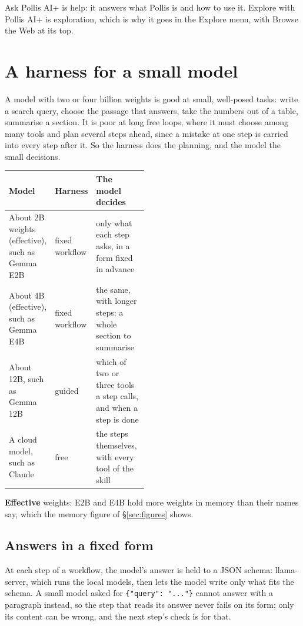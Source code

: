 Ask Pollis AI+ is help: it answers what Pollis is and how to use it. Explore with Pollis AI+ is exploration, which is
why it goes in the Explore menu, with Browse the Web at its top.

\section{A harness for a small model}\label{sec:small}

A model with two or four billion weights is good at small, well-posed tasks: write a search query, choose the
passage that answers, take the numbers out of a table, summarise a section. It is poor at long free loops, where it
must choose among many tools and plan several steps ahead, since a mistake at one step is carried into every step
after it. So the harness does the planning, and the model the small decisions.

\begin{center}\small
\renewcommand{\arraystretch}{1.25}
\begin{tabularx}{\linewidth}{@{}p{0.27\linewidth}p{0.2\linewidth}L@{}}
\toprule
\textbf{Model} & \textbf{Harness} & \textbf{The model decides}\\
\midrule
About 2B weights (effective), such as Gemma E2B & fixed workflow & only what each step asks, in a form fixed in advance\\
About 4B (effective), such as Gemma E4B & fixed workflow & the same, with longer steps: a whole section to summarise\\
About 12B, such as Gemma 12B & guided & which of two or three tools a step calls, and when a step is done\\
A cloud model, such as Claude & free & the steps themselves, with every tool of the skill\\
\bottomrule
\end{tabularx}
\end{center}

\textbf{Effective} weights: E2B and E4B hold more weights in memory than their names say, which the memory figure of
\S\ref{sec:figures} shows.

\subsection{Answers in a fixed form}
At each step of a workflow, the model's answer is held to a JSON schema: llama-server, which runs the local models,
then lets the model write only what fits the schema. A small model asked for \texttt{\{"query": "..."\}} cannot answer
with a paragraph instead, so the step that reads its answer never fails on its form; only its content can be wrong,
and the next step's check is for that.

